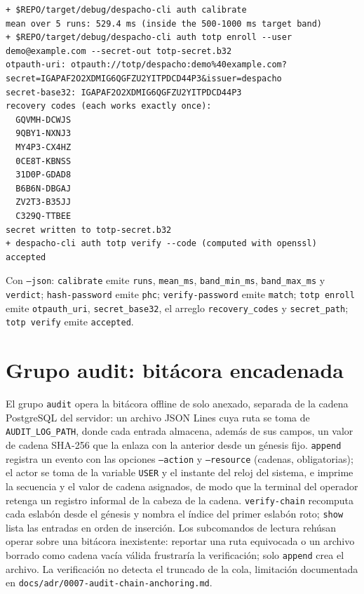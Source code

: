 \begin{lstlisting}[numbers=none,breakatwhitespace=false]
+ $REPO/target/debug/despacho-cli auth calibrate
mean over 5 runs: 529.4 ms (inside the 500-1000 ms target band)
+ $REPO/target/debug/despacho-cli auth totp enroll --user demo@example.com --secret-out totp-secret.b32
otpauth-uri: otpauth://totp/despacho:demo%40example.com?secret=IGAPAF2O2XDMIG6QGFZU2YITPDCD44P3&issuer=despacho
secret-base32: IGAPAF2O2XDMIG6QGFZU2YITPDCD44P3
recovery codes (each works exactly once):
  GQVMH-DCWJS
  9QBY1-NXNJ3
  MY4P3-CX4HZ
  0CE8T-KBNSS
  31D0P-GDAD8
  B6B6N-DBGAJ
  ZV2T3-B35JJ
  C329Q-TTBEE
secret written to totp-secret.b32
+ despacho-cli auth totp verify --code (computed with openssl)
accepted
\end{lstlisting}

Con \texttt{--json}: \texttt{calibrate} emite \texttt{runs}, \texttt{mean\_ms}, \texttt{band\_min\_ms}, \texttt{band\_max\_ms} y \texttt{verdict}; \texttt{hash-password} emite \texttt{phc}; \texttt{verify-password} emite \texttt{match}; \texttt{totp enroll} emite \texttt{otpauth\_uri}, \texttt{secret\_base32}, el arreglo \texttt{recovery\_codes} y \texttt{secret\_path}; \texttt{totp verify} emite \texttt{accepted}.

\section{Grupo audit: bitácora encadenada}\label{sec:cli-audit}

El grupo \texttt{audit} opera la bitácora offline de solo anexado, separada de la cadena PostgreSQL del servidor: un archivo JSON Lines cuya ruta se toma de \texttt{AUDIT\_LOG\_PATH}, donde cada entrada almacena, además de sus campos, un valor de cadena SHA-256 que la enlaza con la anterior desde un génesis fijo. \texttt{append} registra un evento con las opciones \texttt{--action} y \texttt{--resource} (cadenas, obligatorias); el actor se toma de la variable \texttt{USER} y el instante del reloj del sistema, e imprime la secuencia y el valor de cadena asignados, de modo que la terminal del operador retenga un registro informal de la cabeza de la cadena. \texttt{verify-chain} recomputa cada eslabón desde el génesis y nombra el índice del primer eslabón roto; \texttt{show} lista las entradas en orden de inserción. Los subcomandos de lectura rehúsan operar sobre una bitácora inexistente: reportar una ruta equivocada o un archivo borrado como cadena vacía válida frustraría la verificación; solo \texttt{append} crea el archivo. La verificación no detecta el truncado de la cola, limitación documentada en \texttt{docs/adr/0007-audit-chain-anchoring.md}.

